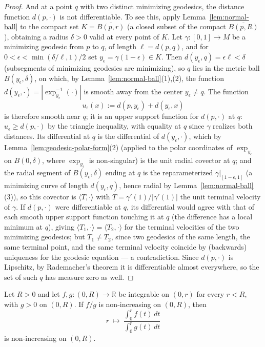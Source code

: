 \begin{proof}
And at a point $q$ with two distinct minimizing geodesics, the
distance function $d(p,\cdot)$ is not differentiable. To see this,
apply Lemma~\ref{lem:normal-ball} to the compact set
$K=\overline{B(p,r)}$ (a closed subset of the compact
$\overline{B(p,R)}$), obtaining a radius $\delta>0$ valid at every
point of $K$. Let $\gamma\colon[0,1]\to M$ be a minimizing
geodesic from $p$ to $q$, of length $\ell=d(p,q)$, and for
$0<\epsilon<\min(\delta/\ell,1)/2$ set
$y_\epsilon=\gamma(1-\epsilon)\in K$. Then
$d(y_\epsilon,q)=\epsilon\ell<\delta$ (subsegments of minimizing
geodesics are minimizing), so $q$ lies in the metric ball
$B(y_\epsilon,\delta)$, on which, by
Lemma~\ref{lem:normal-ball}(1),(2), the function
$d(y_\epsilon,\cdot)=|\exp_{y_\epsilon}^{-1}(\cdot)|$ is smooth
away from the center $y_\epsilon\not=q$. The function
$$u_\epsilon(x):=d\left(p,y_\epsilon\right)
+d\left(y_\epsilon,x\right)$$
is therefore smooth near $q$; it is an upper support function
for $d(p,\cdot)$ at $q$: $u_\epsilon\ge d(p,\cdot)$ by the
triangle inequality, with equality at $q$ since $\gamma$ realizes
both distances. Its differential at $q$ is the differential of
$d(y_\epsilon,\cdot)$, which by
Lemma~\ref{lem:geodesic-polar-form}(2) (applied to the polar
coordinates of $\exp_{y_\epsilon}$ on $B(0,\delta)$, where
$\exp_{y_\epsilon}$ is non-singular) is the unit radial covector
at $q$; and the radial segment of $B(y_\epsilon,\delta)$ ending at
$q$ is the reparameterized $\gamma|_{[1-\epsilon,1]}$ (a
minimizing curve of length $d(y_\epsilon,q)$, hence radial by
Lemma~\ref{lem:normal-ball}(3)), so this covector is $\langle
T,\cdot\rangle$ with $T=\gamma'(1)/|\gamma'(1)|$ the unit terminal
velocity of $\gamma$. If $d(p,\cdot)$ were differentiable at $q$,
its differential would agree with that of each smooth upper
support function touching it at $q$ (the difference has a local
minimum at $q$), giving $\langle
T_1,\cdot\rangle=\langle T_2,\cdot\rangle$ for the terminal
velocities of the two minimizing geodesics; but $T_1\not=T_2$,
since two geodesics of the same length, the same terminal point,
and the same terminal velocity coincide by (backwards) uniqueness
for the geodesic equation --- a contradiction. Since $d(p,\cdot)$
is Lipschitz, by Rademacher's theorem it is differentiable almost
everywhere, so the set of such $q$ has measure zero as well.
\end{proof}

\begin{lemma}
\label{lem:integral-ratio-monotone}
\leanok
Let $R>0$ and let $f,g\colon(0,R)\to\mathbb R$ be integrable on $(0,r)$ for
every $r<R$, with $g>0$ on $(0,R)$. If $f/g$ is non-increasing on $(0,R)$,
then
$$r\ \longmapsto\ \frac{\int_0^rf(t)\,dt}{\int_0^rg(t)\,dt}$$
is non-increasing on $(0,R)$.
\end{lemma}

